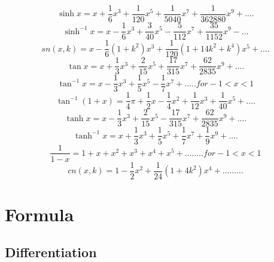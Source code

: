 \begin{equation}
	\sinh x = x + \frac{1}{6} x^3 + \frac{1}{120} x^5 + \frac{1}{5040} x^7 + \frac{1}{362880} x^9 + ....
\end{equation}
\begin{equation}
	\sinh^{-1} x = x - \frac{1}{6} x^3 + \frac{3}{40} x^5 - \frac{5}{112} x^7 + \frac{35}{1152} x^9 -  ...
\end{equation}
\begin{equation}
	sn(x,k) = x - \frac{1}{6}(1+k^2) x^3 + \frac{1}{120} (1 + 14k^2 + k^4) x^5 + .... 
\end{equation}
\begin{equation}
	\tan x = x + \frac{1}{3} x^3 + \frac{2}{15} x^5 + \frac{17}{315} x^7 + \frac{62}{2835} x^9 + ....
\end{equation}
\begin{equation}
	\tan^{-1} x= x - \frac{1}{3} x^3 + \frac{1}{5} x^5 - \frac{1}{7} x^7 + ..... for -1 < x < 1 
\end{equation}
\begin{equation}
	\tan^{-1}(1+x) = \frac{1}{4} \pi + \frac{1}{2} x - \frac{1}{4} x^2 + \frac{1}{12} x ^3 + \frac{1}{40} x^5 + ....
\end{equation}
\begin{equation}
	\tanh x = x - \frac{1}{3} x^3 + \frac{2}{15} x^5 - \frac{17}{315} x^7 + \frac{62}{2835} x^9 + ....
\end{equation}
\begin{equation}
	\tanh^{-1} x = x + \frac{1}{3} x^3 + \frac{1}{5} x^5 + \frac{1}{7} x^7 + \frac{1}{9} x^{9} + ....
\end{equation}
\begin{equation}
	\frac{1}{1-x}=1+x+x^{2}+x^{3}+x^{4}+x^{5}+........for -1<x<1 
\end{equation}
\begin{equation}
	cn(x,k)=1-\frac{1}{2}x^{2}+\frac{1}{24}(1+4k^{2})x^{4}+.........
\end{equation}







\section{Formula}




	\subsection{Differentiation}
	
